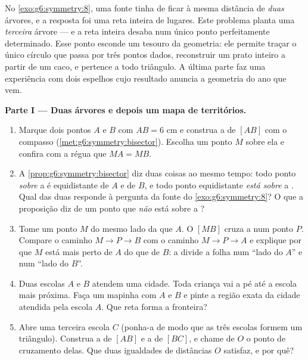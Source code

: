 \begin{problem}
\label{pb:g6:symmetry:1}
No \cref{exo:g6:symmetry:8}, uma fonte tinha de ficar à mesma distância
de \emph{duas} árvores, e a resposta foi uma reta inteira de lugares.
Este problema planta uma \emph{terceira} árvore --- e a reta inteira
desaba num único ponto perfeitamente determinado. Esse ponto esconde um
tesouro da geometria: ele permite traçar o único círculo que passa por
três pontos dados, reconstruir um prato inteiro a partir de um caco, e
pertence a todo triângulo. A última parte faz uma experiência com dois
espelhos cujo resultado anuncia a geometria do ano que vem.

\medskip
\noindent\textbf{Parte I --- Duas árvores e depois um mapa de
territórios.}
\begin{enumerate}
  \item Marque dois pontos $A$ e $B$ com $AB = 6$ cm e construa a
         de $[AB]$ com o compasso
        (\cref{met:g6:symmetry:bisector}). Escolha um ponto $M$ sobre
        ela e confira com a régua que $MA = MB$.
  \item A \cref{prop:g6:symmetry:bisector} diz duas coisas ao mesmo
        tempo: todo ponto \emph{sobre} a  é equidistante de
        $A$ e de $B$, e todo ponto equidistante \emph{está sobre} a
        . Qual das duas responde à pergunta da fonte do
        \cref{exo:g6:symmetry:8}? O que a proposição diz de um ponto
        que \emph{não} está sobre a ?
  \item Tome um ponto $M$ do mesmo lado da  que $A$. O
         $[MB]$ cruza a  num ponto $P$. Compare o
        caminho $M \to P \to B$ com o caminho $M \to P \to A$ e
        explique por que $M$ está mais perto de $A$ do que de $B$: a
         divide a folha num ``lado do $A$'' e num ``lado do
        $B$''.
  \item Duas escolas $A$ e $B$ atendem uma cidade. Toda criança vai a
        pé até a escola mais próxima. Faça um mapinha com $A$ e $B$ e
        pinte a região exata da cidade atendida pela escola $A$. Que
        reta forma a fronteira?
  \item Abre uma terceira escola $C$ (ponha-a de modo que as três
        escolas formem um triângulo). Construa a  de $[AB]$ e
        a  de $[BC]$, e chame de $O$ o ponto de cruzamento
        delas. Que duas igualdades de distâncias $O$ satisfaz, e por
        quê?
\end{enumerate}


\end{problem}
